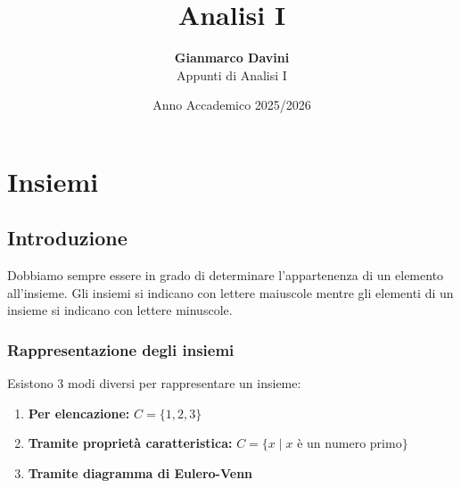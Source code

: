 \documentclass[oneside,10pt]{book} %
\def\notetitle{Analisi I}
\def\noteauthor{
    \textbf{Gianmarco Davini} \\
    Appunti di Analisi I}
\def\notedate{Anno Accademico 2025/2026}
\begin{document}
\title{\textbf{\LARGE{\notetitle} \vspace*{10\baselineskip}}}
\author{\noteauthor}
\date{\notedate}
\maketitle
\newpage
\setcounter{tocdepth}{2}
\tableofcontents
\newpage

\chapter{Insiemi}

\section{Introduzione}


Dobbiamo sempre essere in grado di determinare l'appartenenza di un elemento all'insieme.
Gli insiemi si indicano con lettere maiuscole mentre gli elementi di un insieme si indicano con lettere minuscole.


\subsection{Rappresentazione degli insiemi}
Esistono 3 modi diversi per rappresentare un insieme:
\begin{enumerate}
    \item \textbf{Per elencazione:} $C = \{1, 2, 3\}$
    \item \textbf{Tramite proprietà caratteristica:} $C = \{x \mid x \text{ è un numero primo}\}$
    \item \textbf{Tramite diagramma di Eulero-Venn}
\end{enumerate}
\end{document}
